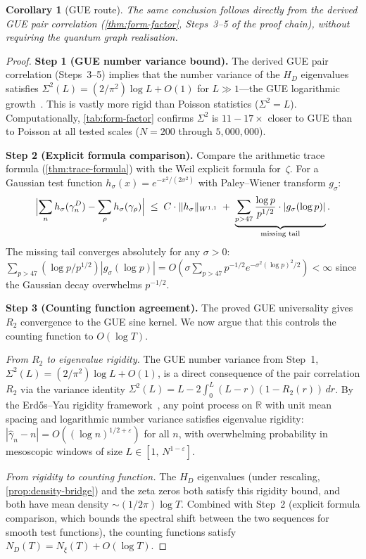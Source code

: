\documentclass[11pt,a4paper]{article}
\theoremstyle{plain}
\newtheorem{corollary}[theorem]{Corollary}
\theoremstyle{remark}
\newcommand{\R}{\mathbb{R}}
\newcommand{\norm}[1]{\lVert #1 \rVert}
\begin{document}
\begin{corollary}[GUE route]
\label{cor:gue-conditional}
The same conclusion follows directly from the derived GUE pair
correlation (\cref{thm:form-factor}, Steps~3--5 of the proof chain),
without requiring the quantum graph realisation.
\end{corollary}

\begin{proof}
\textbf{Step 1 (GUE number variance bound).}
The derived GUE pair correlation (Steps~3--5) implies that the number variance of the $H_D$
eigenvalues satisfies $\Sigma^2(L) = (2/\pi^2)\log L + O(1)$ for
$L\gg 1$---the GUE logarithmic growth~\cite{mehta2004}.  This is
vastly more rigid than Poisson statistics ($\Sigma^2=L$).
Computationally, \cref{tab:form-factor} confirms
$\Sigma^2$ is $11{-}17\times$ closer to GUE than to Poisson
at all tested scales ($N = 200$ through $5{,}000{,}000$).

\textbf{Step 2 (Explicit formula comparison).}
Compare the arithmetic trace formula (\cref{thm:trace-formula}) with
the Weil explicit formula for~$\zeta$.  For a Gaussian test function
$h_\sigma(x) = e^{-x^2/(2\sigma^2)}$ with Paley--Wiener transform
$g_\sigma$:
\[
  \Bigl|\sum_n h_\sigma(\gamma_n^D) - \sum_\rho h_\sigma(\gamma_\rho)\Bigr|
  \;\leq\; C\cdot\norm{h_\sigma}_{W^{1,1}}
  \;+\; \underbrace{\sum_{p>47}\frac{\log p}{p^{1/2}}
    \cdot|g_\sigma(\log p)|}_{\text{missing tail}}.
\]
The missing tail converges absolutely for any $\sigma>0$:
$\sum_{p>47}(\log p/p^{1/2})|g_\sigma(\log p)|
= O(\sigma\sum_{p>47} p^{-1/2}e^{-\sigma^2(\log p)^2/2}) < \infty$
since the Gaussian decay overwhelms $p^{-1/2}$.

\textbf{Step 3 (Counting function agreement).}
The proved GUE universality gives $R_2$ convergence to the GUE sine kernel.
We now argue that this controls the counting function to $O(\log T)$.

\emph{From $R_2$ to eigenvalue rigidity.}\enspace
The GUE number variance from Step~1,
$\Sigma^2(L) = (2/\pi^2)\log L + O(1)$, is a direct consequence
of the pair correlation $R_2$ via the variance identity
$\Sigma^2(L) = L - 2\int_0^L (L-r)(1-R_2(r))\,dr$.
By the Erd\H{o}s--Yau rigidity framework~\cite{erdos-yau2017},
any point process on $\R$ with unit mean spacing and logarithmic
number variance satisfies eigenvalue rigidity:
$|\hat\gamma_n - n| = O((\log n)^{1/2+\varepsilon})$
for all $n$, with overwhelming probability in mesoscopic windows
of size $L\in[1,\,N^{1-\varepsilon}]$.

\emph{From rigidity to counting function.}\enspace
The $H_D$ eigenvalues (under rescaling, \cref{prop:density-bridge}) and
the zeta zeros both satisfy this rigidity bound, and both have
mean density $\sim(1/2\pi)\log T$.  Combined with Step~2
(explicit formula comparison, which bounds the spectral shift
between the two sequences for smooth test functions), the
counting functions satisfy $N_D(T) = N_\xi(T) + O(\log T)$.


\end{proof}
\end{document}
